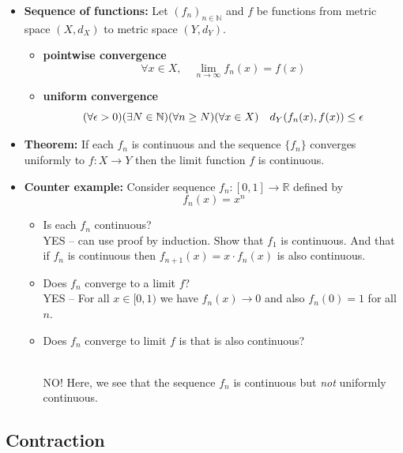\documentclass[11pt,twoside]{report}
\newcommand{\bbN}{{\mathbb{N}}}
\newcommand{\bbR}{{\mathbb{R}}}
\begin{document}
\begin{itemize}
\item \textbf{Sequence of functions:} Let $(f_n)_{n \in \bbN}$  and $f$ be functions from metric space $(X, d_X)$ to metric space $(Y, d_Y)$. 
\begin{itemize}
\item \textbf{pointwise convergence} 
\[
\forall x \in X, \quad \lim_{n \to \infty} f_n(x) = f(x) 
\]

\item \textbf{uniform convergence} 
\[
(\forall \eps > 0 )(\exists N \in \bbN)  (\forall n \ge N) ( \forall x \in X) \quad d_Y(f_n(x), f(x)) \le \eps 
\]

\end{itemize}



\item \textbf{Theorem:} If each $f_n$ is continuous and the sequence $\{f_n\}$ converges uniformly to $f \colon X \to Y$ then the limit function $f$ is continuous. 



\item \textbf{Counter example:} Consider sequence $f_n \colon [0,1] \to \bbR$ defined by 
\[
f_n(x) = x^n 
\] 
\begin{itemize}
\item Is each $f_n$ continuous? \\

YES --  can use proof by induction. Show that $f_1$ is continuous. And that if $f_n$ is continuous then $f_{n+1}(x)  = x \cdot f_n(x)$ is also continuous. 

\item Does $f_n$ converge to a limit $f$? \\

YES -- For all $x \in [0,1)$ we have $f_n(x) \to 0$ and also $f_n(0) = 1$ for all $n$. 

\item Does $f_n$ converge to limit $f$ is that is also continuous?\\\

NO! Here, we see that the sequence $f_n$ is continuous but \emph{not} uniformly continuous. 
\end{itemize}



\end{itemize}





\subsection{Contraction} 
\end{document}
